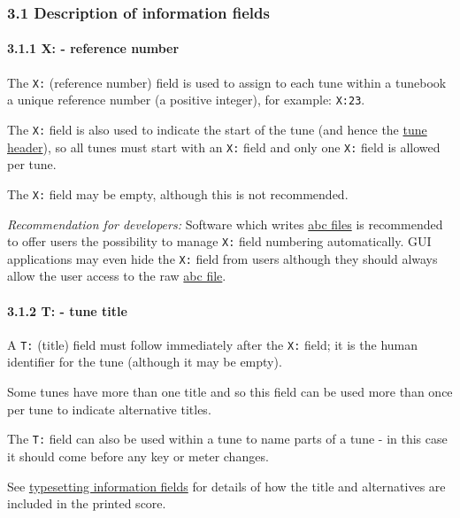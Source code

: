 \hypertarget{description_of_information_fields}{\subsubsection{3.1
Description of information
fields}\label{description_of_information_fields}}

\hypertarget{xreference_number}{\paragraph{3.1.1 X: - reference
number}\label{xreference_number}}

The \texttt{X:} (reference number) field is used to assign to each tune
within a tunebook a unique reference number (a positive integer), for
example: \texttt{X:23}.

The \texttt{X:} field is also used to indicate the start of the tune
(and hence the \protect\hyperlink{tune_header_definition}{tune header}),
so all tunes must start with an \texttt{X:} field and only one
\texttt{X:} field is allowed per tune.

The \texttt{X:} field may be empty, although this is not recommended.

\emph{Recommendation for developers:} Software which writes
\protect\hyperlink{abc_file_definition}{abc files} is recommended to
offer users the possibility to manage \texttt{X:} field numbering
automatically. GUI applications may even hide the \texttt{X:} field from
users although they should always allow the user access to the raw
\protect\hyperlink{abc_file_definition}{abc file}.

\hypertarget{ttune_title}{\paragraph{3.1.2 T: - tune
title}\label{ttune_title}}

A \texttt{T:} (title) field must follow immediately after the
\texttt{X:} field; it is the human identifier for the tune (although it
may be empty).

Some tunes have more than one title and so this field can be used more
than once per tune to indicate alternative titles.

The \texttt{T:} field can also be used within a tune to name parts of a
tune - in this case it should come before any key or meter changes.

See \protect\hyperlink{typesetting_information_fields}{typesetting
information fields} for details of how the title and alternatives are
included in the printed score.

